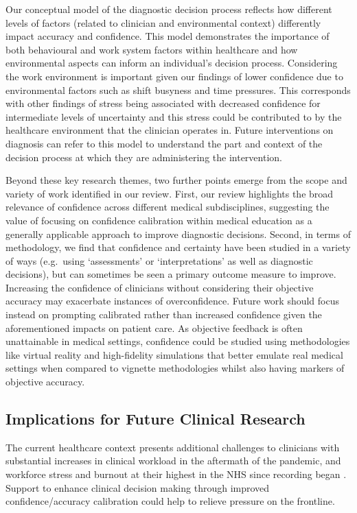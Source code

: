 \documentclass[a4paper, nobind]{templates/ociamthesis}
\begin{document}
\hfill\break
Our conceptual model of the diagnostic decision process reflects how different levels of factors (related to clinician and environmental context) differently impact accuracy and confidence. This model demonstrates the importance of both behavioural and work system factors within healthcare and how environmental aspects can inform an individual's decision process. Considering the work environment is important given our findings of lower confidence due to environmental factors such as shift busyness and time pressures. This corresponds with other findings of stress being associated with decreased confidence for intermediate levels of uncertainty \autocite{heereman_stress_2011} and this stress could be contributed to by the healthcare environment that the clinician operates in. Future interventions on diagnosis can refer to this model to understand the part and context of the decision process at which they are administering the intervention.

\hfill\break
Beyond these key research themes, two further points emerge from the scope and variety of work identified in our review. First, our review highlights the broad relevance of confidence across different medical subdisciplines, suggesting the value of focusing on confidence calibration within medical education as a generally applicable approach to improve diagnostic decisions. Second, in terms of methodology, we find that confidence and certainty have been studied in a variety of ways (e.g.~using `assessments' or `interpretations' as well as diagnostic decisions), but can sometimes be seen a primary outcome measure to improve. Increasing the confidence of clinicians without considering their objective accuracy may exacerbate instances of overconfidence. Future work should focus instead on prompting calibrated rather than increased confidence given the aforementioned impacts on patient care. As objective feedback is often unattainable in medical settings, confidence could be studied using methodologies like virtual reality and high-fidelity simulations that better emulate real medical settings when compared to vignette methodologies whilst also having markers of objective accuracy.

\subsection{Implications for Future Clinical Research}\label{implications-for-future-clinical-research}

The current healthcare context presents additional challenges to clinicians with substantial increases in clinical workload in the aftermath of the pandemic, and workforce stress and burnout at their highest in the NHS since recording began \autocite{noauthor_state_2024}. Support to enhance clinical decision making through improved confidence/accuracy calibration could help to relieve pressure on the frontline.
\end{document}
